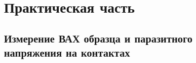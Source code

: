 \documentclass[a4paper,14pt]{extarticle}
\begin{document}
\section{Практическая часть}
\subsection{Измерение ВАХ образца и паразитного напряжения на контактах}
\end{document}
